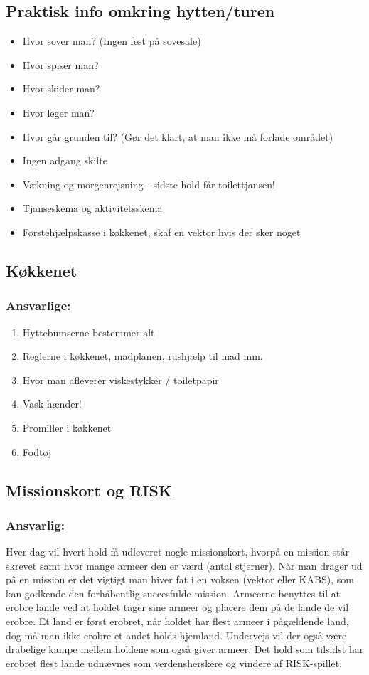 \subsection*{Praktisk info omkring hytten/turen}
\begin{itemize}
  \item Hvor sover man? (Ingen fest på sovesale)
  \item Hvor spiser man?
  \item Hvor skider man?
  \item Hvor leger man?
  \item Hvor går grunden til? (Gør det klart, at man ikke må forlade området)
  \item Ingen adgang skilte
  \item Vækning og morgenrejsning - sidste hold får toilettjansen!
  \item Tjanseskema og aktivitetsskema
  \item Førstehjælpskasse i køkkenet, skaf en vektor hvis der sker noget
\end{itemize}

\subsection*{Køkkenet}
\subsubsection*{\textbf{Ansvarlige:} }
\begin{enumerate}
  \item Hyttebumserne bestemmer alt
  \item Reglerne i køkkenet, madplanen, rushjælp til mad mm.
  \item Hvor man afleverer viskestykker / toiletpapir
  \item Vask hænder!
  \item Promiller i køkkenet
  \item Fodtøj
\end{enumerate}

\subsection*{Missionskort og RISK}
\subsubsection*{\textbf{Ansvarlig:} \Mighty}
Hver dag vil hvert hold få udleveret nogle missionskort, hvorpå en mission står skrevet samt hvor mange armeer den er værd (antal stjerner). Når man drager ud på en mission er det vigtigt man hiver fat i en voksen (vektor eller KABS), som kan godkende den forhåbentlig succesfulde mission. Armeerne benyttes til at erobre lande ved at holdet tager sine armeer og placere dem på de lande de vil erobre. Et land er først erobret, når holdet har flest armeer i pågældende land, dog må man ikke erobre et andet holds hjemland. Undervejs vil der også være drabelige kampe mellem holdene som også giver armeer. Det hold som tilsidst har erobret flest lande udnævnes som verdensherskere og vindere af RISK-spillet.  \\


